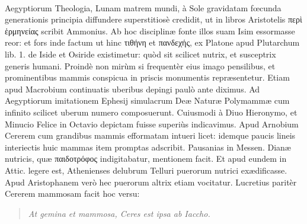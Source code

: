 \documentclass[a4paper, 11pt, oneside, polutonikogreek, latin]{article}
\begin{document}
\paragraph{}
Aegyptiorum Theologia, Lunam matrem mundi, à Sole gravidatam fœcunda generationis principia diffundere superstitiosè credidit, ut in libros Aristotelis περὶ ἑρμηνείας scribit Ammonius. Ab hoc disciplinæ fonte illos suam Isim essormasse reor: et fors inde factum ut hinc 	τιθήνη et πανδεχής, ex Platone apud Plutarchum lib. 1. de Iside et Osiride existimetur: quòd sit scilicet nutrix, et susceptrix generis humani. Proindè non mirùm si frequentèr eius imago pensilibus, et prominentibus mammis conspicua in priscis monumentis repræsentetur. Etiam apud Macrobium continuatis uberibus depingi paulò ante diximus. Ad Aegyptiorum imitationem Ephesij simulacrum Deæ Naturæ Polymammæ cum infinito scilicet uberum numero composuerunt. Cuiusmodi à Diuo Hieronymo, et Minucio Felice in Octavio depictam fuisse superiùs indicavimus. Apud Arnobium Cererem cum grandibus mammis efformatam intueri licet: idemque paucis lineis interiectis huic mammas item promptas adscribit. Pausanias in Messen. Dianæ nutricis, quæ παιδοτρόφος indigitabatur, mentionem facit. Et apud eundem in Attic. legere est, Athenienses delubrum Telluri puerorum nutrici exædificasse. Apud Aristophanem verò hec puerorum altrix etiam vocitatur. Lucretius paritèr Cererem mammosam facit hoc versu:
\begin{quote}
\emph{At gemina et mammosa, Ceres est ipsa ab Iaccho.}
\end{quote}
\vspace*{-4mm}
\end{document}
